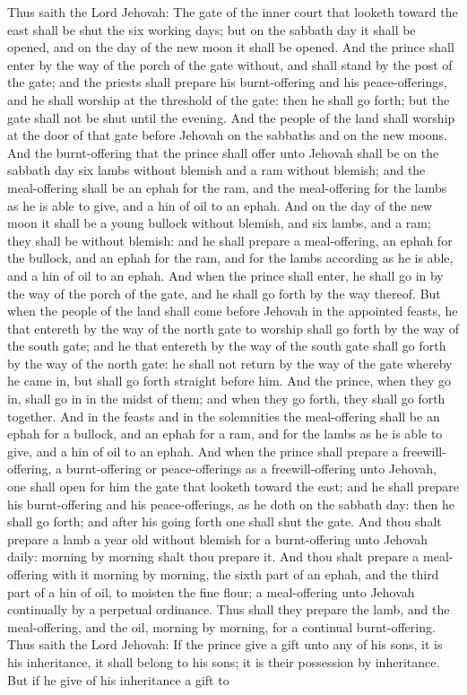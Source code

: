 Thus saith the Lord Jehovah: The gate of the inner court that looketh toward the east shall be shut the six working days; but on the sabbath day it shall be opened, and on the day of the new moon it shall be opened. And the prince shall enter by the way of the porch of the gate without, and shall stand by the post of the gate; and the priests shall prepare his burnt-offering and his peace-offerings, and he shall worship at the threshold of the gate: then he shall go forth; but the gate shall not be shut until the evening. And the people of the land shall worship at the door of that gate before Jehovah on the sabbaths and on the new moons. And the burnt-offering that the prince shall offer unto Jehovah shall be on the sabbath day six lambs without blemish and a ram without blemish; and the meal-offering shall be an ephah for the ram, and the meal-offering for the lambs as he is able to give, and a hin of oil to an ephah.  And on the day of the new moon it shall be a young bullock without blemish, and six lambs, and a ram; they shall be without blemish: and he shall prepare a meal-offering, an ephah for the bullock, and an ephah for the ram, and for the lambs according as he is able, and a hin of oil to an ephah. And when the prince shall enter, he shall go in by the way of the porch of the gate, and he shall go forth by the way thereof.  But when the people of the land shall come before Jehovah in the appointed feasts, he that entereth by the way of the north gate to worship shall go forth by the way of the south gate; and he that entereth by the way of the south gate shall go forth by the way of the north gate: he shall not return by the way of the gate whereby he came in, but shall go forth straight before him. And the prince, when they go in, shall go in in the midst of them; and when they go forth, they shall go forth together. And in the feasts and in the solemnities the meal-offering shall be an ephah for a bullock, and an ephah for a ram, and for the lambs as he is able to give, and a hin of oil to an ephah. And when the prince shall prepare a freewill-offering, a burnt-offering or peace-offerings as a freewill-offering unto Jehovah, one shall open for him the gate that looketh toward the east; and he shall prepare his burnt-offering and his peace-offerings, as he doth on the sabbath day: then he shall go forth; and after his going forth one shall shut the gate.  And thou shalt prepare a lamb a year old without blemish for a burnt-offering unto Jehovah daily: morning by morning shalt thou prepare it. And thou shalt prepare a meal-offering with it morning by morning, the sixth part of an ephah, and the third part of a hin of oil, to moisten the fine flour; a meal-offering unto Jehovah continually by a perpetual ordinance. Thus shall they prepare the lamb, and the meal-offering, and the oil, morning by morning, for a continual burnt-offering.  Thus saith the Lord Jehovah: If the prince give a gift unto any of his sons, it is his inheritance, it shall belong to his sons; it is their possession by inheritance. But if he give of his inheritance a gift to 